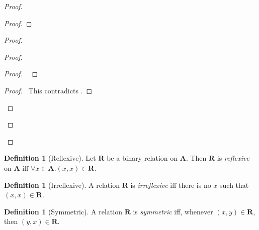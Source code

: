 \documentclass{book}
\let\qed\relax
\theoremstyle{definition}
\newtheorem{df}[ax]{Definition}
\begin{document}
\begin{proof}
\pf
{}
\begin{proof}
\end{proof}
\begin{proof}
	\begin{proof}
		\begin{proof}
			\pf\ 
		\end{proof}
		\qedstep
		\begin{proof}
			\pf\ This contradicts .
		\end{proof}
	\end{proof}
\end{proof}
\qed
\end{proof}

\begin{df}[Reflexive]
Let $\mathbf{R}$ be a binary relation on $\mathbf{A}$. Then $\mathbf{R}$ is \emph{reflexive} on $\mathbf{A}$ iff $\forall x \in \mathbf{A}. (x,x) \in \mathbf{R}$.
\end{df}

\begin{df}[Irreflexive]
A relation $\mathbf{R}$ is \emph{irreflexive} iff there is no $x$ such that $(x,x) \in \mathbf{R}$.
\end{df}

\begin{df}[Symmetric]
A relation $\mathbf{R}$ is \emph{symmetric} iff, whenever $(x,y) \in \mathbf{R}$, then $(y,x) \in \mathbf{R}$.
\end{df}
\end{document}
